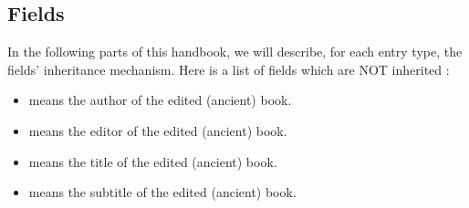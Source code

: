 \documentclass{ltxdockit}[2011/03/25]
\begin{document}
\subsection{Fields}

In the following parts of this handbook, we will describe, for each entry type, the fields' inheritance mechanism. Here is a list of fields which are NOT inherited :
\begin{itemize}
  \item {} means the author of the edited (ancient) book.
  \item {} means the editor of the edited (ancient) book.
  \item {} means the title of the edited (ancient) book.
  \item {} means the subtitle of the edited (ancient) book.
 
\end{itemize}


\def\firstofthree#1#2#3{#1}
\def\secondofthree#1#2#3{#2}
\def\thirdofthree#1#2#3{#3}
\renewcommand{\do}[1]{%
  \edef\entrytype{\firstofthree#1}%
  \edef\entrykey{\secondofthree#1}%
  \edef\entrymore{\thirdofthree#1}%
  \subsection{\bibtype{bookin\entrytype}}
  \subsubsection{Meaning}
  For book edited in a \bibtype{\entrytype} entry.
  \subsubsection{.bib example}
  
  \inputminted[breaklines]{latex}{example-bookin\entrytype.bib}
  
  \subsubsection{Fields inheritance}
  The graph~\ref{example-bookin\entrytype} shows the fields inheritance.
  \begin{figure}
    \centering
    \texttt{[image: example-bookin\\entrytype.pdf]}
    \label{example-bookin\entrytype}
    \caption{Inheritance related to the \bibtype{bookin\entrytype} entry type}
  \end{figure} 
  \subsubsection{Output example}
  \begin{quotation}
    \cite{\entrykey}
  \end{quotation}
  \entrymore 
}
\end{document}
